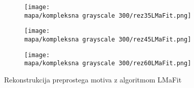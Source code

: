 \begin{figure}
    \begin{subfigure}{0.325\linewidth}
        \texttt{[image: \\mapa/kompleksna grayscale 300/rez35LMaFit.png]}
    \end{subfigure}
    \hfill
    \begin{subfigure}{0.325\linewidth}
        \texttt{[image: \\mapa/kompleksna grayscale 300/rez45LMaFit.png]}
    \end{subfigure}
    \hfill
    \begin{subfigure}{0.325\linewidth}
        \texttt{[image: \\mapa/kompleksna grayscale 300/rez60LMaFit.png]}
    \end{subfigure}
    \caption{Rekonstrukcija preprostega motiva z algoritmom LMaFit}
\end{figure}